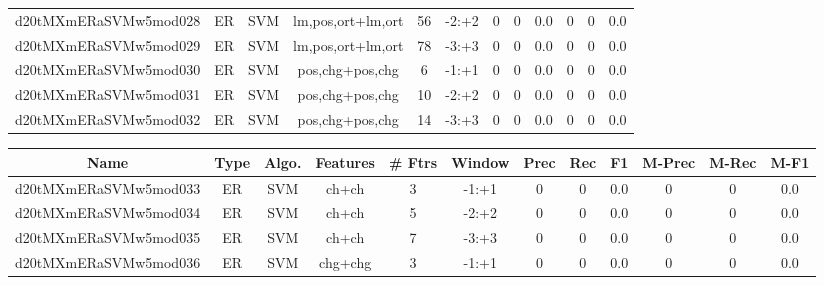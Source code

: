 \documentclass[a4paper]{article}
\begin{document}
\begin{landscape}
\begin{center}
\begin{tabular}{ |c|c|c|c|c|c|c|c|c|c|c|c|}
 
 	
 	\small{ d20tMXmERaSVMw5mod028 } & ER & SVM & lm,pos,ort+lm,ort  &  56 &  -2:+2  &  0 & 0 & 0.0  &  0 & 0 & 0.0 \\
 	

 
 	
 	\small{ d20tMXmERaSVMw5mod029 } & ER & SVM & lm,pos,ort+lm,ort  &  78 &  -3:+3  &  0 & 0 & 0.0  &  0 & 0 & 0.0 \\
 	

 
 	
 	\small{ d20tMXmERaSVMw5mod030 } & ER & SVM & pos,chg+pos,chg  &  6 &  -1:+1  &  0 & 0 & 0.0  &  0 & 0 & 0.0 \\
 	

 
 	
 	\small{ d20tMXmERaSVMw5mod031 } & ER & SVM & pos,chg+pos,chg  &  10 &  -2:+2  &  0 & 0 & 0.0  &  0 & 0 & 0.0 \\
 	

 
 	
 	\small{ d20tMXmERaSVMw5mod032 } & ER & SVM & pos,chg+pos,chg  &  14 &  -3:+3  &  0 & 0 & 0.0  &  0 & 0 & 0.0 \\
 	
 \hline
\end{tabular}
\end{center}




\begin{center}
\begin{tabular}{ |c|c|c|c|c|c|c|c|c|c|c|c|} 
 \hline
 	Name & Type & Algo. & Features & \# Ftrs & Window & Prec & Rec & F1 & M-Prec & M-Rec & M-F1\\
 \hline

 	

 
 	
 	\small{ d20tMXmERaSVMw5mod033 } & ER & SVM & ch+ch  &  3 &  -1:+1  &  0 & 0 & 0.0  &  0 & 0 & 0.0 \\
 	

 
 	
 	\small{ d20tMXmERaSVMw5mod034 } & ER & SVM & ch+ch  &  5 &  -2:+2  &  0 & 0 & 0.0  &  0 & 0 & 0.0 \\
 	

 
 	
 	\small{ d20tMXmERaSVMw5mod035 } & ER & SVM & ch+ch  &  7 &  -3:+3  &  0 & 0 & 0.0  &  0 & 0 & 0.0 \\
 	

 
 	
 	\small{ d20tMXmERaSVMw5mod036 } & ER & SVM & chg+chg  &  3 &  -1:+1  &  0 & 0 & 0.0  &  0 & 0 & 0.0 \\
 	


\end{tabular}
\end{center}
\end{landscape}
\end{document}
